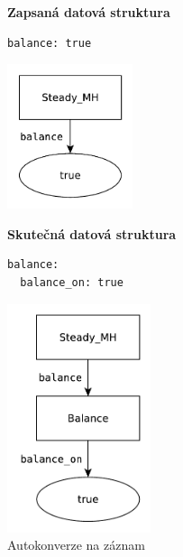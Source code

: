 \documentclass[FM,bw,DP]{tulthesis}
\begin{document}
\begin{figure}[ht]
\begin{minipage}[t]{0.45\linewidth}
\vspace{0pt}
\textbf{Zapsaná datová struktura}\\
\vspace{-5pt}
\begin{lstlisting}
balance: true

\end{lstlisting}
\vspace*{-20pt}
\begin{center}
\includegraphics[height=120pt]{../img/autoconversion_record_before.pdf}
\end{center}
\end{minipage}
\quad
\begin{minipage}[t]{0.45\linewidth}
\vspace{0pt}
\textbf{Skutečná datová struktura}\\
\vspace{-5pt}
\begin{lstlisting}
balance:
  balance_on: true
\end{lstlisting}
\vspace*{-20pt}
\begin{center}
\includegraphics[height=190pt]{../img/autoconversion_record_after.pdf}
\end{center}
\end{minipage}
\caption{Autokonverze na záznam}
\label{img:autoconversion_record}
\end{figure}	
\end{document}

